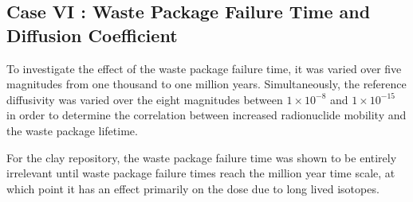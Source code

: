 
\subsection{Case VI : Waste Package Failure Time and Diffusion Coefficient}

To investigate the effect of the waste package failure time, it was varied over 
five magnitudes from one thousand to one million years. Simultaneously, the reference 
diffusivity was varied over the eight magnitudes between $1\times10^{-8}$ and 
$1\times10^{-15}$ in order to determine the correlation between increased 
radionuclide mobility and the waste package lifetime. 


For the clay repository, the waste package failure time was shown to be entirely 
irrelevant until waste package failure times reach the million year time scale, 
at which point it has an effect primarily on the dose due to long lived 
isotopes. 

